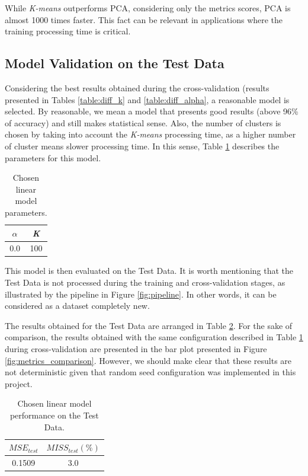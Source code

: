 \documentclass{article}
\begin{document}
While \textit{K-means} outperforms PCA, considering only the metrics scores, PCA is almost 1000 times faster. This fact can be relevant in applications where the training processing time is critical. 

\subsection{Model Validation on the Test Data}

Considering the best results obtained during the cross-validation (results presented in Tables \ref{table:diff_k} and \ref{table:diff_alpha}, a reasonable model is selected. By reasonable, we mean a model that presents good results (above 96\% of accuracy) and still makes statistical sense. Also, the number of clusters is chosen by taking into account the \textit{K-means} processing time, as a higher number of cluster means slower processing time. In this sense, Table \ref{table:best_linear} describes the parameters for this model.

\begin{table}[h!]
\begin{center}
 \begin{tabular}{||c | c||} 
 \hline
 $\alpha$ & \textit{K} \\ [0.5ex]
 \hline\hline
 0.0 & 100\\ 
 \hline
\end{tabular}
\caption{Chosen linear model parameters.}
\label{table:best_linear}
\end{center}
\end{table}

This model is then evaluated on the Test Data. It is worth mentioning that the Test Data is not processed during the training and cross-validation stages, as illustrated by the pipeline in Figure \ref{fig:pipeline}. In other words, it can be considered as a dataset completely new.

The results obtained for the Test Data are arranged in Table \ref{table:best_linear_metrics}. For the sake of comparison, the results obtained with the same configuration described in Table \ref{table:best_linear} during cross-validation are presented in the bar plot presented in Figure \ref{fig:metrics_comparison}. However, we should make clear that these results are not deterministic given that random seed configuration was implemented in this project.

\begin{table}[h!]
\begin{center}
 \begin{tabular}{||c | c||} 
 \hline
 $MSE_{test}$ & $MISS_{test} (\%)$ \\ [0.5ex]
 \hline\hline
  0.1509 & 3.0\\ 
 \hline
\end{tabular}
\caption{Chosen linear model performance on the Test Data.}
\label{table:best_linear_metrics}
\end{center}
\end{table}
\end{document}
